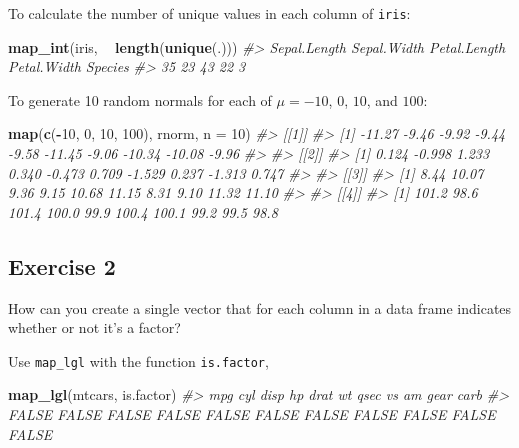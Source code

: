 \documentclass[]{book}
\newenvironment{Shaded}{\begin{snugshade}}{\end{snugshade}}
\newcommand{\CommentTok}[1]{\textcolor[rgb]{0.56,0.35,0.01}{\textit{#1}}}
\newcommand{\DataTypeTok}[1]{\textcolor[rgb]{0.13,0.29,0.53}{#1}}
\newcommand{\DecValTok}[1]{\textcolor[rgb]{0.00,0.00,0.81}{#1}}
\newcommand{\KeywordTok}[1]{\textcolor[rgb]{0.13,0.29,0.53}{\textbf{#1}}}
\newcommand{\NormalTok}[1]{#1}
\newcommand{\OperatorTok}[1]{\textcolor[rgb]{0.81,0.36,0.00}{\textbf{#1}}}
\newcommand{\StringTok}[1]{\textcolor[rgb]{0.31,0.60,0.02}{#1}}
\theoremstyle{definition}
\theoremstyle{definition}
\theoremstyle{definition}
\theoremstyle{remark}
\begin{document}
To calculate the number of unique values in each column of
\texttt{iris}:

\begin{Shaded}
\begin{Highlighting}[]
\KeywordTok{map_int}\NormalTok{(iris, }\OperatorTok{~}\StringTok{ }\KeywordTok{length}\NormalTok{(}\KeywordTok{unique}\NormalTok{(.)))}
\CommentTok{#> Sepal.Length  Sepal.Width Petal.Length  Petal.Width      Species }
\CommentTok{#>           35           23           43           22            3}
\end{Highlighting}
\end{Shaded}

To generate 10 random normals for each of \(\mu = -10\), \(0\), \(10\),
and \(100\):

\begin{Shaded}
\begin{Highlighting}[]
\KeywordTok{map}\NormalTok{(}\KeywordTok{c}\NormalTok{(}\OperatorTok{-}\DecValTok{10}\NormalTok{, }\DecValTok{0}\NormalTok{, }\DecValTok{10}\NormalTok{, }\DecValTok{100}\NormalTok{), rnorm, }\DataTypeTok{n =} \DecValTok{10}\NormalTok{)}
\CommentTok{#> [[1]]}
\CommentTok{#>  [1] -11.27  -9.46  -9.92  -9.44  -9.58 -11.45  -9.06 -10.34 -10.08  -9.96}
\CommentTok{#> }
\CommentTok{#> [[2]]}
\CommentTok{#>  [1]  0.124 -0.998  1.233  0.340 -0.473  0.709 -1.529  0.237 -1.313  0.747}
\CommentTok{#> }
\CommentTok{#> [[3]]}
\CommentTok{#>  [1]  8.44 10.07  9.36  9.15 10.68 11.15  8.31  9.10 11.32 11.10}
\CommentTok{#> }
\CommentTok{#> [[4]]}
\CommentTok{#>  [1] 101.2  98.6 101.4 100.0  99.9 100.4 100.1  99.2  99.5  98.8}
\end{Highlighting}
\end{Shaded}

\hypertarget{exercise-2-54}{%
\subsection{Exercise 2}\label{exercise-2-54}}

How can you create a single vector that for each column in a data frame
indicates whether or not it's a factor?

Use \texttt{map\_lgl} with the function \texttt{is.factor},

\begin{Shaded}
\begin{Highlighting}[]
\KeywordTok{map_lgl}\NormalTok{(mtcars, is.factor)}
\CommentTok{#>   mpg   cyl  disp    hp  drat    wt  qsec    vs    am  gear  carb }
\CommentTok{#> FALSE FALSE FALSE FALSE FALSE FALSE FALSE FALSE FALSE FALSE FALSE}
\end{Highlighting}
\end{Shaded}
\end{document}
